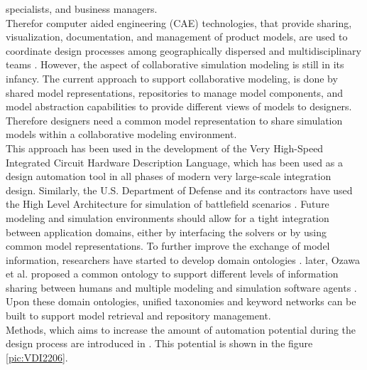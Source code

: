 specialists, and business managers.\cite{sinha_modeling_2001}\\
Therefor computer aided engineering (CAE) technologies, that provide sharing, visualization, 
documentation, and management of product models,
are used to coordinate design processes among geographically dispersed and multidisciplinary
teams \cite{finger_creating_1994, bajaj_web_1999, iwasaki_web-based_2002}.
However, the aspect of collaborative simulation modeling is still in its infancy. 
The current approach to support collaborative modeling, is done by shared model representations, 
repositories to manage model components, and model abstraction capabilities to provide different views of models to designers.
Therefore designers need a common model representation to share simulation models within a collaborative modeling environment.\cite{sinha_modeling_2001}\\
This approach has been used in the development of the Very High-Speed Integrated Circuit Hardware Description Language,
which has been used as a design automation tool in all phases of modern very large-scale integration design. 
Similarly, the U.S. Department of Defense and its contractors have used the High Level Architecture for simulation of
battlefield scenarios \cite{lutz_high_1998,park_relational_1994}.
Future modeling and simulation environments should allow for a tight integration
between application domains, either by interfacing the solvers or by using common model representations.
To further improve the exchange of model information, researchers have started to develop domain ontologies \cite{devedzic_survey_1999}. 
later, Ozawa et al. proposed a common ontology to support different levels of information sharing between humans and multiple
modeling and simulation software agents \cite{ozawa_model_2000}. 
Upon these domain ontologies, unified taxonomies and keyword networks
can be built to support model retrieval and repository management.\\
Methods, which aims to increase the amount of automation potential during the design process
are introduced in \cite{Herrmann2021, Berschik2021, Altun2021, Russwurm2021}.
This potential is shown in the figure \ref{pic:VDI2206}.
